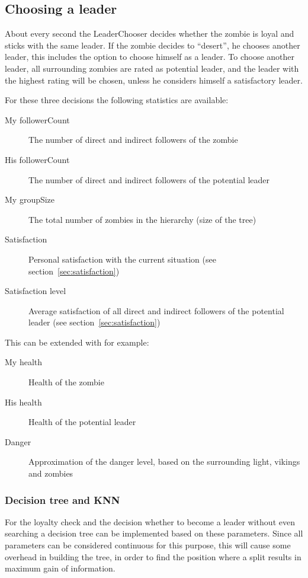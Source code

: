 \subsection{Choosing a leader}
About every second the LeaderChooser decides whether the zombie is loyal and sticks with the same leader. If the zombie decides to ``desert'', he chooses another leader, this includes the option to choose himself as a leader. To choose another leader, all surrounding zombies are rated as potential leader, and the leader with the highest rating will be chosen, unless he considers himself a satisfactory leader.

For these three decisions the following statistics are available:
\begin{description}
 \item [My followerCount] The number of direct and indirect followers of the zombie
 \item [His followerCount] The number of direct and indirect followers of the potential leader
 \item [My groupSize] The total number of zombies in the hierarchy (size of the tree)
 \item [Satisfaction] Personal satisfaction with the current situation (see section~\ref{sec:satisfaction})
 \item [Satisfaction level] Average satisfaction of all direct and indirect followers of the potential leader (see section~\ref{sec:satisfaction})
\end{description}
This can be extended with for example:
\begin{description}
 \item [My health] Health of the zombie
 \item [His health] Health of the potential leader
 \item [Danger] Approximation of the danger level, based on the surrounding light, vikings and zombies
\end{description}

\subsubsection{Decision tree and KNN}
For the loyalty check and the decision whether to become a leader without even searching a decision tree can be implemented based on these parameters. Since all parameters can be considered continuous for this purpose, this will cause some overhead in building the tree, in order to find the position where a split results in maximum gain of information.

